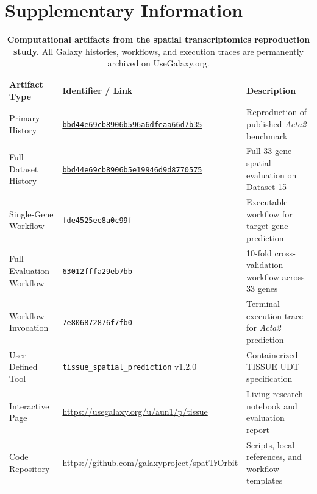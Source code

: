 \documentclass[11pt,letterpaper]{article}
\begin{document}



\clearpage
\appendix
\renewcommand{\thetable}{S\arabic{table}}
\setcounter{table}{0}

\section*{Supplementary Information}

\begin{table}[!htbp]
\centering
\small
\begin{tabularx}{\textwidth}{llX}
\toprule
\textbf{Artifact Type} & \textbf{Identifier / Link} & \textbf{Description} \\
\midrule
Primary History & \href{https://usegalaxy.org/histories/view?id=bbd44e69cb8906b596a6dfeaa66d7b35}{\texttt{bbd44e69cb8906b596a6dfeaa66d7b35}} & Reproduction of published \textit{Acta2} benchmark \\
Full Dataset History & \href{https://usegalaxy.org/histories/view?id=bbd44e69cb8906b5e19946d9d8770575}{\texttt{bbd44e69cb8906b5e19946d9d8770575}} & Full 33-gene spatial evaluation on Dataset 15 \\
Single-Gene Workflow & \href{https://usegalaxy.org/workflows/run?id=fde4525ee8a0c99f}{\texttt{fde4525ee8a0c99f}} & Executable workflow for target gene prediction \\
Full Evaluation Workflow & \href{https://usegalaxy.org/workflows/run?id=63012fffa29eb7bb}{\texttt{63012fffa29eb7bb}} & 10-fold cross-validation workflow across 33 genes \\
Workflow Invocation & \texttt{7e806872876f7fb0} & Terminal execution trace for \textit{Acta2} prediction \\
User-Defined Tool & \texttt{tissue\_spatial\_prediction} v1.2.0 & Containerized TISSUE UDT specification \\
Interactive Page & \url{https://usegalaxy.org/u/aun1/p/tissue} & Living research notebook and evaluation report \\
Code Repository & \url{https://github.com/galaxyproject/spatTrOrbit} & Scripts, local references, and workflow templates \\
\bottomrule
\end{tabularx}
\caption{\textbf{Computational artifacts from the spatial transcriptomics reproduction study.} All Galaxy histories, workflows, and execution traces are permanently archived on UseGalaxy.org.}
\label{tab:case1_artifacts}
\end{table}
\end{document}
